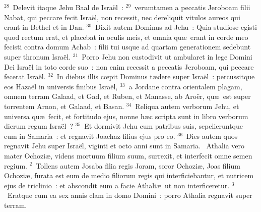 ${}^{28}$~Delevit itaque Jehu Baal de Isra\"el~:
${}^{29}$~verumtamen a peccatis Jeroboam filii Nabat, qui peccare fecit Isra\"el, non recessit, nec dereliquit vitulos aureos qui erant in Bethel et in Dan.
${}^{30}$~Dixit autem Dominus ad Jehu~: Quia studiose egisti quod rectum erat, et placebat in oculis meis, et omnia qu\ae\ erant in corde meo fecisti contra domum Achab~: filii tui usque ad quartam generationem sedebunt super thronum Isra\"el.
${}^{31}$~Porro Jehu non custodivit ut ambularet in lege Domini Dei Isra\"el in toto corde suo~: non enim recessit a peccatis Jeroboam, qui peccare fecerat Isra\"el.
${}^{32}$~In diebus illis cœpit Dominus t\ae dere super Isra\"el~: percussitque eos Haza\"el in universis finibus Isra\"el,
${}^{33}$~a Jordane contra orientalem plagam, omnem terram Galaad, et Gad, et Ruben, et Manasse, ab Aro\"er, qu\ae\ est super torrentem Arnon, et Galaad, et Basan.
${}^{34}$~Reliqua autem verborum Jehu, et universa qu\ae\ fecit, et fortitudo ejus, nonne h\ae c scripta sunt in libro verborum dierum regum Isra\"el~?
${}^{35}$~Et dormivit Jehu cum patribus suis, sepelieruntque eum in Samaria~: et regnavit Joachaz filius ejus pro eo.
${}^{36}$~Dies autem quos regnavit Jehu super Isra\"el, viginti et octo anni sunt in Samaria.
~\lettrine[lines=10,image=true,loversize=0.05,lraise=-0.03]{A}{}thalia vero mater Ochozi\ae , videns mortuum filium suum, surrexit, et interfecit omne semen regium.
${}^{2}$~Tollens autem Josaba filia regis Joram, soror Ochozi\ae , Joas filium Ochozi\ae , furata est eum de medio filiorum regis qui interficiebantur, et nutricem ejus de triclinio~: et abscondit eum a facie Athali\ae\ ut non interficeretur.
${}^{3}$~Eratque cum ea sex annis clam in domo Domini~: porro Athalia regnavit super terram.


